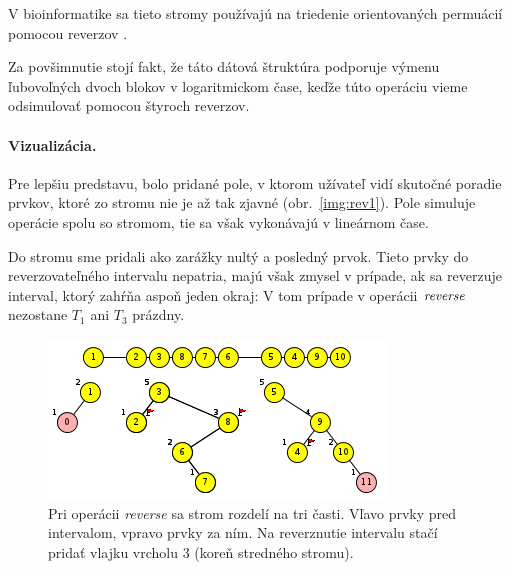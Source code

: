 V bioinformatike sa tieto stromy používajú na triedenie orientovaných permuácií
pomocou reverzov \citep{reversals,reversals2}.

Za povšimnutie stojí fakt, že táto dátová štruktúra podporuje výmenu ľubovoľných dvoch blokov
v logaritmickom čase, keďže túto operáciu vieme odsimulovať pomocou štyroch reverzov.

\paragraph{Vizualizácia.}
Pre lepšiu predstavu, bolo pridané pole, v ktorom užívateľ vidí skutočné poradie prvkov, ktoré
zo stromu nie je až tak zjavné (obr.~\ref{img:rev1}). Pole simuluje operácie spolu so stromom,
tie sa však vykonávajú v lineárnom čase.

Do stromu sme pridali ako zarážky nultý a posledný prvok. Tieto prvky do reverzovateľného
intervalu nepatria, majú však zmysel v prípade, ak sa reverzuje interval, ktorý zahŕňa
aspoň jeden okraj: V tom prípade v operácii $\mathop{\mathit{reverse}}$ nezostane $T_1$ ani $T_3$ prázdny. 

\begin{figure}
\includegraphics[width=\columnwidth]{obrazky/rev3trees.png}
\caption{Pri operácii \emph{reverse} sa strom rozdelí na tri časti. 
Vľavo prvky pred intervalom, vpravo prvky za ním. 
Na reverznutie intervalu stačí pridať vlajku vrcholu 3 (koreň stredného stromu).}
\label{img:rev2}
\end{figure}

